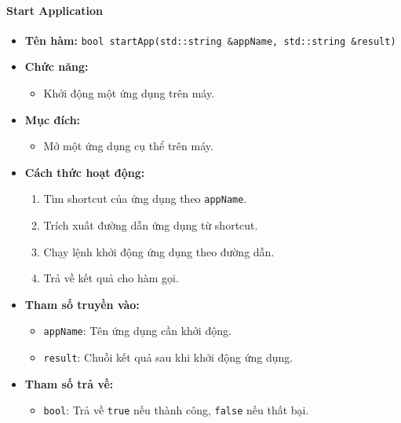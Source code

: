 \paragraph{Start Application}
\begin{itemize}
    \item \textbf{Tên hàm:} \texttt{bool startApp(std::string \&appName, std::string \&result)}
    \item \textbf{Chức năng:}
    \begin{itemize}
        \item Khởi động một ứng dụng trên máy.
    \end{itemize}
    \item \textbf{Mục đích:}
    \begin{itemize}
        \item Mở một ứng dụng cụ thể trên máy.
    \end{itemize}
    \item \textbf{Cách thức hoạt động:}
    \begin{enumerate}
        \item Tìm shortcut của ứng dụng theo \texttt{appName}.
        \item Trích xuất đường dẫn ứng dụng từ shortcut.
        \item Chạy lệnh khởi động ứng dụng theo đường dẫn.
        \item Trả về kết quả cho hàm gọi.
    \end{enumerate}
    \item \textbf{Tham số truyền vào:}
    \begin{itemize}
        \item \texttt{appName}: Tên ứng dụng cần khởi động.
        \item \texttt{result}: Chuỗi kết quả sau khi khởi động ứng dụng.
    \end{itemize}
    \item \textbf{Tham số trả về:}
    \begin{itemize}
        \item \texttt{bool}: Trả về \texttt{true} nếu thành công, \texttt{false} nếu thất bại.
    \end{itemize}
\end{itemize}

